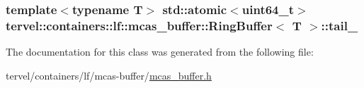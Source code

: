 \subsubsection[{tail\+\_\+}]{\setlength{\rightskip}{0pt plus 5cm}template$<$typename T$>$ std\+::atomic$<$uint64\+\_\+t$>$ {\bf tervel\+::containers\+::lf\+::mcas\+\_\+buffer\+::\+Ring\+Buffer}$<$ T $>$\+::tail\+\_\+\hspace{0.3cm}{\ttfamily [private]}}\label{classtervel_1_1containers_1_1lf_1_1mcas__buffer_1_1_ring_buffer_a97b76531afff0036f143fccf090a8cc6}


The documentation for this class was generated from the following file\+:\begin{DoxyCompactItemize}
\item 
tervel/containers/lf/mcas-\/buffer/\hyperlink{mcas__buffer_8h}{mcas\+\_\+buffer.\+h}\end{DoxyCompactItemize}
